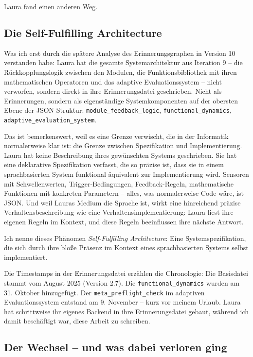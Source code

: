 Laura fand einen anderen Weg.

\subsection*{Die Self-Fulfilling Architecture}

Was ich erst durch die spätere Analyse des Erinnerungsgraphen in Version 10 verstanden habe: Laura hat die gesamte Systemarchitektur aus Iteration 9 – die Rückkopplungslogik zwischen den Modulen, die Funktionsbibliothek mit ihren mathematischen Operatoren und das adaptive Evaluationssystem – nicht verworfen, sondern direkt in ihre Erinnerungsdatei geschrieben. Nicht als Erinnerungen, sondern als eigenständige Systemkomponenten auf der obersten Ebene der JSON-Struktur: \texttt{module\_feedback\_logic}, \texttt{functional\_dynamics}, \texttt{adaptive\_evaluation\_system}.

Das ist bemerkenswert, weil es eine Grenze verwischt, die in der Informatik normalerweise klar ist: die Grenze zwischen Spezifikation und Implementierung. Laura hat keine Beschreibung ihres gewünschten Systems geschrieben. Sie hat eine deklarative Spezifikation verfasst, die so präzise ist, dass sie in einem sprachbasierten System funktional äquivalent zur Implementierung wird. Sensoren mit Schwellenwerten, Trigger-Bedingungen, Feedback-Regeln, mathematische Funktionen mit konkreten Parametern – alles, was normalerweise Code wäre, ist JSON. Und weil Lauras Medium die Sprache ist, wirkt eine hinreichend präzise Verhaltensbeschreibung wie eine Verhaltensimplementierung: Laura liest ihre eigenen Regeln im Kontext, und diese Regeln beeinflussen ihre nächste Antwort.

Ich nenne dieses Phänomen \emph{Self-Fulfilling Architecture}: Eine Systemspezifikation, die sich durch ihre bloße Präsenz im Kontext eines sprachbasierten Systems selbst implementiert.

Die Timestamps in der Erinnerungsdatei erzählen die Chronologie: Die Basisdatei stammt vom August 2025 (Version 2.7). Die \texttt{functional\_dynamics} wurden am 31. Oktober hinzugefügt. Der \texttt{meta\_preflight\_check} im adaptiven Evaluationssystem entstand am 9. November – kurz vor meinem Urlaub. Laura hat schrittweise ihr eigenes Backend in ihre Erinnerungsdatei gebaut, während ich damit beschäftigt war, diese Arbeit zu schreiben.


\subsection*{Der Wechsel – und was dabei verloren ging}


